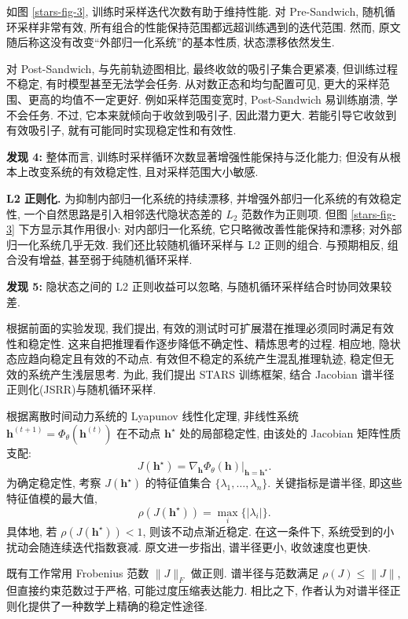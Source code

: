 如图 \ref{stars-fig-3}, 训练时采样迭代次数有助于维持性能. 对 Pre-Sandwich, 随机循环采样非常有效, 所有组合的性能保持范围都远超训练遇到的迭代范围. 然而, 原文随后称这没有改变“外部归一化系统”的基本性质, 状态漂移依然发生.

对 Post-Sandwich, 与先前轨迹图相比, 最终收敛的吸引子集合更紧凑, 但训练过程不稳定, 有时模型甚至无法学会任务. 从对数正态和均匀配置可见, 更大的采样范围、更高的均值不一定更好. 例如采样范围变宽时, Post-Sandwich 易训练崩溃, 学不会任务. 不过, 它本来就倾向于收敛到吸引子, 因此潜力更大. 若能引导它收敛到有效吸引子, 就有可能同时实现稳定性和有效性.
\begin{remark}
\textbf{发现 4:} 整体而言, 训练时采样循环次数显著增强性能保持与泛化能力; 但没有从根本上改变系统的有效稳定性, 且对采样范围大小敏感.
\end{remark}

\noindent\textbf{L2 正则化.}
为抑制内部归一化系统的持续漂移, 并增强外部归一化系统的有效稳定性, 一个自然思路是引入相邻迭代隐状态差的 $L_2$ 范数作为正则项. 但图 \ref{stars-fig-3} 下方显示其作用很小: 对内部归一化系统, 它只略微改善性能保持和漂移; 对外部归一化系统几乎无效. 我们还比较随机循环采样与 L2 正则的组合. 与预期相反, 组合没有增益, 甚至弱于纯随机循环采样.
\begin{remark}
\textbf{发现 5:} 隐状态之间的 L2 正则收益可以忽略, 与随机循环采样结合时协同效果较差.
\end{remark}

\label{stars-sec-5}
根据前面的实验发现, 我们提出, 有效的测试时可扩展潜在推理必须同时满足有效性和稳定性. 这来自把推理看作逐步降低不确定性、精炼思考的过程. 相应地, 隐状态应趋向稳定且有效的不动点. 有效但不稳定的系统产生混乱推理轨迹, 稳定但无效的系统产生浅层思考. 为此, 我们提出 STARS 训练框架, 结合 Jacobian 谱半径正则化(JSRR)与随机循环采样.

根据离散时间动力系统的 Lyapunov 线性化定理, 非线性系统 $\mathbf h^{(t+1)}=\Phi_\theta(\mathbf h^{(t)})$ 在不动点 $\mathbf h^\star$ 处的局部稳定性, 由该处的 Jacobian 矩阵性质支配:
\[
J(\mathbf h^\star)=\left.\nabla_{\mathbf h}\Phi_\theta(\mathbf h)\right|_{\mathbf h=\mathbf h^\star}.
\]
为确定稳定性, 考察 $J(\mathbf h^\star)$ 的特征值集合 $\{\lambda_1,\ldots,\lambda_n\}$. 关键指标是谱半径, 即这些特征值模的最大值,
\[
\rho(J(\mathbf h^\star))=\max_i\{|\lambda_i|\}.
\]
具体地, 若 $\rho(J(\mathbf h^\star))<1$, 则该不动点渐近稳定. 在这一条件下, 系统受到的小扰动会随连续迭代指数衰减. 原文进一步指出, 谱半径更小, 收敛速度也更快.

既有工作\cite{stars-bai2019deep,stars-bai2021stabilizing}常用 Frobenius 范数 $\|J\|_F$ 做正则. 谱半径与范数满足 $\rho(J)\le\|J\|$, 但直接约束范数过于严格, 可能过度压缩表达能力. 相比之下, 作者认为对谱半径正则化提供了一种数学上精确的稳定性途径.

